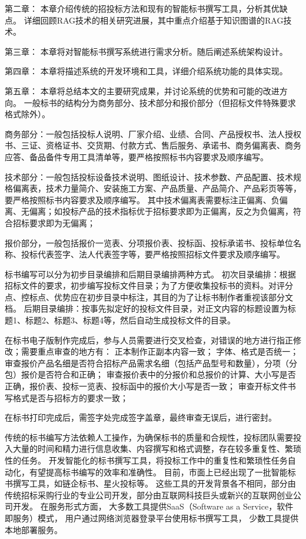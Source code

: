 \documentclass{xmu}
\begin{document}
第二章：
本章介绍传统的招投标方法和现有的智能标书撰写工具，分析其优缺点。
详细回顾RAG技术的相关研究进展，其中重点介绍基于知识图谱的RAG技术。

第三章：
本章将对智能标书撰写系统进行需求分析。随后阐述系统架构设计。

第四章：
本章将描述系统的开发环境和工具，详细介绍系统功能的具体实现。

第五章：
本章将总结本文的主要研究成果，并讨论系统的优势和可能的改进方向。
一般标书的结构分为商务部分、技术部分和报价部分（但招标文件特殊要求格式除外）。

商务部分：一般包括投标人说明、厂家介绍、业绩、合同、产品授权书、法人授权书、三证、资格证书、交货期、付款方式、售后服务、承诺书、商务偏离表、商务应答、备品备件专用工具清单等，要严格按照标书内容要求及顺序编写。

技术部分：一般包括投标设备技术说明、图纸设计、技术参数、产品配置、技术规格偏离表，技术力量简介、安装施工方案、产品质量、产品简介、产品彩页等等，要严格按照标书内容要求及顺序编写。
其中技术偏离表需要标注正偏离、负偏离、无偏离；如投标产品的技术指标优于招标要求即为正偏离，反之为负偏离，符合招标要求即为无偏离；

报价部分，一般包括报价一览表、分项报价表、投标函、投标承诺书、投标单位名称、投标代表签字、法人代表签字等，要严格按照招标文件要求及顺序编写。

标书编写可以分为初步目录编排和后期目录编排两种方式。
初次目录编排：根据招标文件的要求，初步编写投标文件目录；为了方便收集投标书的资料。对评分点、控标点、优势应在初步目录中标注，其目的为了让标书制作者重视该部分文档。
后期目录编排：按事先拟定好的投标文件目录，对正文内容的标题设置为标题1、标题2、标题3、标题4等，然后自动生成投标文件的目录。

在标书电子版制作完成后，参与人员需要进行交叉检查，对错误的地方进行指正修改；需要重点审查的地方有：
正本制作正副本内容一致；
字体、格式是否统一；
审查报价产品名细是否符合招标产品需求名细（包括产品型号和数量），分项（分包）报价是否符合和正确；
审查报价表中的分报价和总报价的计算、大小写是否正确，报价表、投标一览表、投标函中的报价大小写是否一致；
审查开标文件书写格式是否与招标方的要求一致；

在标书打印完成后，需签字处完成签字盖章，最终审查无误后，进行密封。

传统的标书编写方法依赖人工操作，为确保标书的质量和合规性，投标团队需要投入大量的时间和精力进行信息收集、内容撰写和格式调整，存在较多重复性、繁琐性的任务。
开发智能化的标书撰写工具，将投标工作中的重复性和繁琐性任务自动化，有望提高标书编写的效率和准确性。
目前，市面上已经出现了一批智能标书撰写工具，如链企标书、星火投标等。
这些工具的开发背景各不相同，部分由传统招标采购行业的专业公司开发，部分由互联网科技巨头或新兴的互联网创业公司开发。
在服务形式方面，
大多数工具提供SaaS（Software as a Service，软件即服务）模式，
用户通过网络浏览器登录平台使用标书撰写工具，
少数工具提供本地部署服务。
\end{document}
